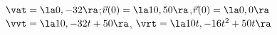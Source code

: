 {$\vat = \la 0,-32\ra$;\quad $\vec v(0) = \la 10,50\ra$,\quad $\vec r(0) = \la 0,0\ra$
}
{$\vvt = \la 10,-32t+50\ra$, $\vrt = \la 10t,-16t^2+50t\ra$
}